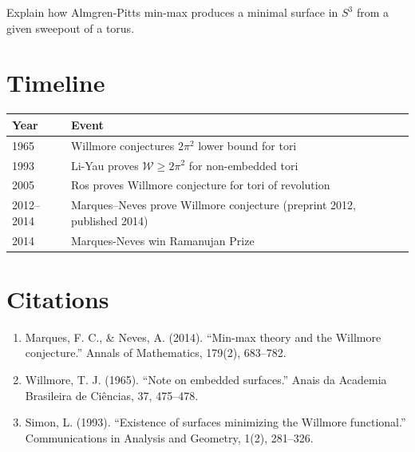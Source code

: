\begin{exercise}[Advanced]
Explain how Almgren-Pitts min-max produces a minimal surface in $S^3$ from a given sweepout of a torus.
\end{exercise}

\section{Timeline}

\begin{tabularx}{\linewidth}{lX}
\toprule
\textbf{Year} & \textbf{Event} \\ \midrule
1965 & Willmore conjectures $2\pi^2$ lower bound for tori \\ 
1993 & Li-Yau proves $\mathcal{W} \ge 2\pi^2$ for non-embedded tori \\ 
2005 & Ros proves Willmore conjecture for tori of revolution \\ 
2012--2014 & Marques--Neves prove Willmore conjecture (preprint 2012, published 2014) \\
2014 & Marques-Neves win Ramanujan Prize \\ \bottomrule
\end{tabularx}

\section{Citations}

\begin{enumerate}
\item Marques, F. C., \& Neves, A. (2014). ``Min-max theory and the Willmore conjecture.'' Annals of Mathematics, 179(2), 683--782.
\item Willmore, T. J. (1965). ``Note on embedded surfaces.'' Anais da Academia Brasileira de Ciências, 37, 475--478.
\item Simon, L. (1993). ``Existence of surfaces minimizing the Willmore functional.'' Communications in Analysis and Geometry, 1(2), 281--326.
\end{enumerate}
